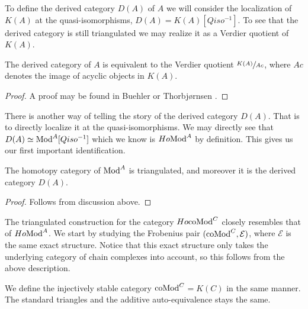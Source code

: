 \documentclass[../thesis.tex]{subfiles}
\begin{document}
            \begin{center}
            \end{center}

            To define the derived category $D(A)$ of $A$ we will consider the localization of $K(A)$ at the quasi-isomorphisms, $D(A) = K(A)[Qiso^{-1}]$. To see that the derived category is still triangulated we may realize it as a Verdier quotient of $K(A)$.

            \begin{proposition}
                The derived category of $A$ is equivalent to the Verdier quotient $\sfrac{K(A)}{Ac}$, where $Ac$ denotes the image of acyclic objects in $K(A)$.
            \end{proposition}

            \begin{proof}
                A proof may be found in Buehler \cite{Buhler10} or Thorbjørnsen \cite{Thorbjornsen21}.
            \end{proof}

            There is another way of telling the story of the derived category $D(A)$. That is to directly localize it at the quasi-isomorphisms. We may directly see that $D(A) \simeq \tt{Mod}^A[Qiso^{-1}]$ which we know is $Ho \tt{Mod}^A$ by definition. This gives us our first important identification.

            \begin{thm}
                The homotopy category of $\tt{Mod}^A$ is triangulated, and moreover it is the derived category $D(A)$.
            \end{thm}

            \begin{proof}
                Follows from discussion above.
            \end{proof}

            The triangulated construction for the category $Ho \tt{coMod}^C$ closely resembles that of $Ho \tt{Mod}^A$. We start by studying the Frobenius pair $(\tt{coMod}^C, \mathcal{E})$, where $\mathcal{E}$ is the same exact structure. Notice that this exact structure only takes the underlying category of chain complexes into account, so this follows from the above description.

            We define the injectively stable category \underline{$\tt{coMod}^C$}$=K(C)$ in the same manner. The standard triangles and the additive auto-equivalence stays the same.
\end{document}

